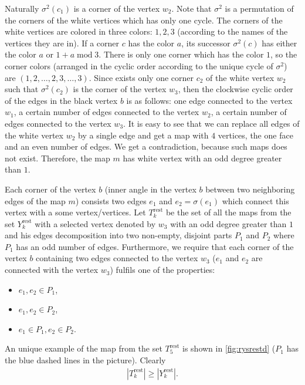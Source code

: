 \documentclass[submission]{FPSAC2021}
\DeclareMathOperator{\rest}{rest}
\newcommand{\nast}
{
	\sigma
}
\begin{document}
Naturally $\nast^2(c_1)$ 
is a corner of the vertex $w_2$. 
Note that $\nast^2$ is a permutation of the corners of 
the white vertices which has only one cycle. 
The corners of the white vertices are colored in three colors: $1, 2, 3$
(according to the names of the vertices they are in).  
If a corner $c$ has the color $a$, 
its successor $\nast^2(c)$ has either the color $a$ or $1+a \operatorname{mod} 3$. 
There is only one corner which has the color $1$, so the corner colors 
(arranged in the cyclic order according to the unique cycle of $\nast^2$) are 
$(1, 2, \ldots, 2, 3, \ldots, 3)$.
Since exists only one corner $ c_2 $ of the white vertex $ w_2 $ such 
that $ \nast ^ 2 (c_2) $ is the corner of the vertex $ w_3 $, 
then the clockwise cyclic order of the edges in the black vertex $b$ is as
follows: one edge connected to the vertex $w_1$, a certain number of edges connected
to the vertex $w_2$, a certain number of edges connected to the vertex $w_3$.
It is easy to see that we can replace all edges of the white vertex $w_2$ by a
single edge and get a map with $4$ vertices, the one face and an even number of
edges. We get a contradiction, because such maps does not exist. Therefore, the
map $m$ has white vertex with an odd degree greater than $1$.

Each corner of the vertex $b$ (inner angle in the vertex $b$ between 
two neighboring edges of the map $m$) consists two edges $e_1$ and $e_2=\nast(e_1)$
which connect this vertex with a some vertex/vertices. Let $T_k^{\rest}$
be the set of all the maps from the set $Y_k^{\rest}$ with a selected vertex
denoted by $w_3$ with an odd degree greater than $1$ and his edges decomposition into
two non-empty, disjoint parts $P_1$ and $P_2$ where $P_1$ has an odd
number of edges. Furthermore, we require that each corner 
of the vertex $b$ containing two edges connected to the vertex $w_3$ 
($e_1$ and $e_2$ are connected with the vertex $w_3$)
fulfils one of the properties:
\begin{itemize}
\item $e_1, e_2 \in P_1$,
\item $e_1, e_2 \in P_2$, 
\item $e_1 \in P_1, e_2 \in P_2$. 
\end{itemize}  
An unique example of the map from the set $T_{5}^{\rest}$ is shown in
\cref{fig:rysrestd} ($P_1$ has the blue dashed lines in the picture).
Clearly
\begin{align}
\label{ineqrest}
|T_{k}^{\rest}| \geq |Y_{k}^{\rest}|.
\end{align}
\end{document}

